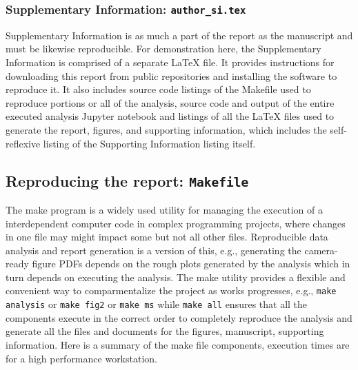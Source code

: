 \documentclass[helv,10pt,man,floatsintext]{apa6}  %
\begin{document}
\subsubsection{Supplementary Information: \texttt{author_si.tex}}

Supplementary Information is as much a part of the report as the
manuscript and must be likewise reproducible. For demonstration here,
the Supplementary Information is comprised of a separate \LaTeX{}
file.  It provides instructions for downloading this report from
public repositories and installing the software to reproduce it. It
also includes source code listings of the Makefile used to reproduce
portions or all of the analysis, source code and output of the entire
executed analysis Jupyter notebook and listings of all the \LaTeX{}
files used to generate the report, figures, and supporting
information, which includes the self-reflexive listing of the
Supporting Information listing itself.


\subsection{Reproducing the report: \texttt{Makefile}}

The make program is a widely used utility for managing the execution
of a interdependent computer code in complex programming projects,
where changes in one file may might impact some but not all other
files. Reproducible data analysis and report generation is a version
of this, e.g., generating the camera-ready figure PDFs depends on the
rough plots generated by the analysis which in turn depends on
executing the analysis. The make utility provides a flexible and
convenient way to comparmentalize the project as works progresses,
e.g., \texttt{make analysis} or \texttt{make fig2}
or \texttt{make ms} while \texttt{make all}
ensures that all the components execute in the correct order to
completely reproduce the analysis and generate all the files and
documents for the figures, manuscript, supporting information. Here is
a summary of the make file components, execution times are for a high
performance workstation.
\end{document}
